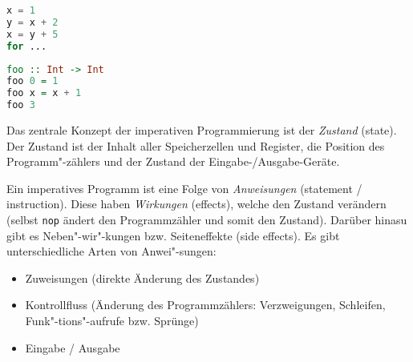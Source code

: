 \begin{lstlisting}[language=Python, caption=Imperatives Programm]
x = 1
y = x + 2
x = y + 5
for ...
\end{lstlisting}


\begin{lstlisting}[language=Haskell, caption=Funktionales Programm]
foo :: Int -> Int
foo 0 = 1
foo x = x + 1
foo 3
\end{lstlisting}

Das zentrale Konzept der imperativen Programmierung ist der \emph{Zustand} (state). Der Zustand ist der Inhalt aller Speicherzellen und Register, die Position des Programm"-zählers und der Zustand der Eingabe-/Ausgabe-Geräte.

Ein imperatives Programm ist eine Folge von \emph{Anweisungen} (statement / instruction). Diese haben \emph{Wirkungen} (effects), welche den Zustand verändern (selbst \texttt{nop} ändert den Programmzähler und somit den Zustand). Darüber hinasu gibt es Neben"-wir"-kungen bzw. Seiteneffekte (side effects). Es gibt unterschiedliche Arten von Anwei"-sungen:
\begin{itemize}
    \item Zuweisungen (direkte Änderung des Zustandes)
    \item Kontrollfluss (Änderung des Programmzählers: Verzweigungen, Schleifen, Funk"-tions"-aufrufe bzw. Sprünge)
    \item Eingabe / Ausgabe
\end{itemize}